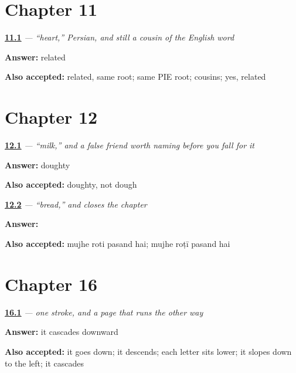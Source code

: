 \section*{Chapter 11}

\noindent\begin{minipage}[t]{\linewidth}
\raggedright
\hyperlink{review-UR-C11-dil-cousin}{\textbf{11.1}} \emph{ — \textquotedblleft{}heart,\textquotedblright{} Persian, and still a cousin of the English word}\par
\small \textbf{Answer:} related\par
\footnotesize \textbf{Also accepted:} related, same root; same PIE root; cousins; yes, related
\end{minipage}\par\medskip

\section*{Chapter 12}

\noindent\begin{minipage}[t]{\linewidth}
\raggedright
\hyperlink{review-UR-C12-doodh-false-friend}{\textbf{12.1}} \emph{ — \textquotedblleft{}milk,\textquotedblright{} and a false friend worth naming before you fall for it}\par
\small \textbf{Answer:} doughty\par
\footnotesize \textbf{Also accepted:} doughty, not dough
\end{minipage}\par\medskip

\noindent\begin{minipage}[t]{\linewidth}
\raggedright
\hyperlink{review-UR-C12-roti-pasand}{\textbf{12.2}} \emph{ — \textquotedblleft{}bread,\textquotedblright{} and  closes the chapter}\par
\small \textbf{Answer:}    \par
\footnotesize \textbf{Also accepted:} mujhe roti pasand hai; mujhe roṭī pasand hai
\end{minipage}\par\medskip

\section*{Chapter 16}

\noindent\begin{minipage}[t]{\linewidth}
\raggedright
\hyperlink{review-UR-W16-alef-cascade}{\textbf{16.1}} \emph{ — one stroke, and a page that runs the other way}\par
\small \textbf{Answer:} it cascades downward\par
\footnotesize \textbf{Also accepted:} it goes down; it descends; each letter sits lower; it slopes down to the left; it cascades
\end{minipage}\par\medskip

